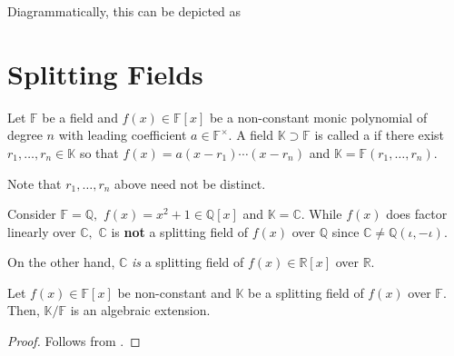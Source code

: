 Diagrammatically, this can be depicted as
\begin{center}
\end{center}

\section{Splitting Fields}

\begin{defn}%
    Let $\mathbb{F}$ be a field and $f(x) \in \mathbb{F}[x]$ be a non-constant monic polynomial of degree $n$ with leading coefficient $a \in \mathbb{F}^\times.$ A field $\mathbb{K} \supset \mathbb{F}$ is called a  if there exist $r_1, \ldots, r_n \in \mathbb{K}$ so that $f(x) = a(x - r_1)\cdots(x - r_n)$ and $\mathbb{K} = \mathbb{F}(r_1, \ldots, r_n).$
\end{defn}

Note that $r_1, \ldots, r_n$ above need not be distinct.

\begin{ex}
    Consider $\mathbb{F} = \mathbb{Q},$ $f(x) = x^2 + 1 \in \mathbb{Q}[x]$ and $\mathbb{K} = \mathbb{C}.$ While $f(x)$ does factor linearly over $\mathbb{C},$ $\mathbb{C}$ is \textbf{not} a splitting field of $f(x)$ over $\mathbb{Q}$ since $\mathbb{C} \neq \mathbb{Q}(\iota, -\iota).$

    On the other hand, $\mathbb{C}$ \emph{is} a splitting field of $f(x) \in \mathbb{R}[x]$ over $\mathbb{R}.$
\end{ex}

\begin{cor}
    Let $f(x) \in \mathbb{F}[x]$ be non-constant and $\mathbb{K}$ be a splitting field of $f(x)$ over $\mathbb{F}.$ Then, $\mathbb{K}/\mathbb{F}$ is an algebraic extension.
\end{cor}
\begin{proof} 
    Follows from .
\end{proof}

